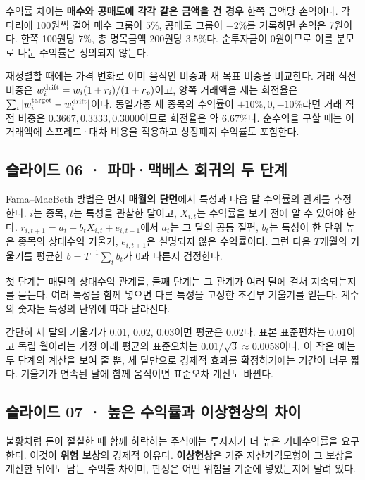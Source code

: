 \documentclass[11pt,a4paper]{article}
\begin{document}
수익률 차이는 \textbf{매수와 공매도에 각각 같은 금액을 건 경우} 한쪽 금액당 손익이다. 각 다리에 100원씩 걸어 매수 그룹이 $5\%$, 공매도 그룹이 $-2\%$를 기록하면 손익은 7원이다. 한쪽 100원당 $7\%$, 총 명목금액 200원당 $3.5\%$다. 순투자금이 0원이므로 이를 분모로 나눈 수익률은 정의되지 않는다.\par

재정렬할 때에는 가격 변화로 이미 움직인 비중과 새 목표 비중을 비교한다. 거래 직전 비중은 $w_i^{\rm drift}=w_i(1+r_i)/(1+r_p)$이고, 양쪽 거래액을 세는 회전율은 $\sum_i|w_i^{\rm target}-w_i^{\rm drift}|$이다. 동일가중 세 종목의 수익률이 $+10\%,0,-10\%$라면 거래 직전 비중은 $0.3667,0.3333,0.3000$이므로 회전율은 약 $6.67\%$다. 순수익을 구할 때는 이 거래액에 스프레드·대차 비용을 적용하고 상장폐지 수익률도 포함한다.\par

\subsection{슬라이드 06 · 파마·맥베스 회귀의 두 단계}
Fama–MacBeth 방법은 먼저 \textbf{매월의 단면}에서 특성과 다음 달 수익률의 관계를 추정한다. $i$는 종목, $t$는 특성을 관찰한 달이고, $X_{i,t}$는 수익률을 보기 전에 알 수 있어야 한다. $r_{i,t+1}=a_t+b_tX_{i,t}+e_{i,t+1}$에서 $a_t$는 그 달의 공통 절편, $b_t$는 특성이 한 단위 높은 종목의 상대수익 기울기, $e_{i,t+1}$은 설명되지 않은 수익률이다. 그런 다음 $T$개월의 기울기를 평균한 $\bar b=T^{-1}\sum_tb_t$가 0과 다른지 검정한다.\par

첫 단계는 매달의 상대수익 관계를, 둘째 단계는 그 관계가 여러 달에 걸쳐 지속되는지를 묻는다. 여러 특성을 함께 넣으면 다른 특성을 고정한 조건부 기울기를 얻는다. 계수의 숫자는 특성의 단위에 따라 달라진다.\par

간단히 세 달의 기울기가 0.01, 0.02, 0.03이면 평균은 0.02다. 표본 표준편차는 0.01이고 독립 월이라는 가정 아래 평균의 표준오차는 $0.01/\sqrt3\approx0.0058$이다. 이 작은 예는 두 단계의 계산을 보여 줄 뿐, 세 달만으로 경제적 효과를 확정하기에는 기간이 너무 짧다. 기울기가 연속된 달에 함께 움직이면 표준오차 계산도 바뀐다.\par

\subsection{슬라이드 07 · 높은 수익률과 이상현상의 차이}
불황처럼 돈이 절실한 때 함께 하락하는 주식에는 투자자가 더 높은 기대수익률을 요구한다. 이것이 \textbf{위험 보상}의 경제적 이유다. \textbf{이상현상}은 기준 자산가격모형이 그 보상을 계산한 뒤에도 남는 수익률 차이며, 판정은 어떤 위험을 기준에 넣었는지에 달려 있다.\par
\end{document}
